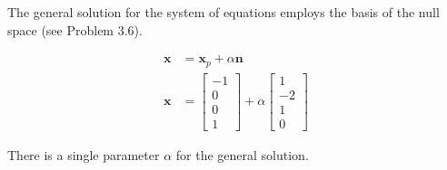 The general solution for the system of equations employs the basis
of the null space (see Problem 3.6).

\begin{align*}
 \mathbf{x} &= \mathbf{x}_p + \alpha \mathbf{n}\\
 \mathbf{x} &= \begin{bmatrix} -1 \\ 0 \\0 \\1 \end{bmatrix}
        + \alpha \begin{bmatrix}1\\ -2\\ 1\\ 0 \end{bmatrix}
\end{align*}

There is a single parameter $\alpha$ for the general solution.
